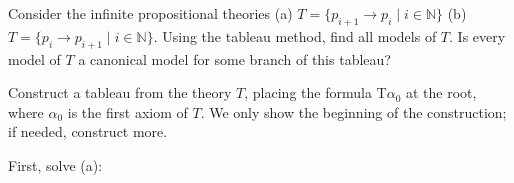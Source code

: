 \begin{problem}

    Consider the infinite propositional theories (a) $T=\{p_{i+1} \to p_i\mid i\in \mathbb{N}\}$ (b) $T=\{p_i \to p_{i+1}\mid i\in \mathbb{N}\}$. Using the tableau method, find all models of $T$. Is every model of $T$ a canonical model for some branch of this tableau? %

    \begin{solution}

        Construct a tableau from the theory $T$, placing the formula $\mathrm{T}\alpha_0$ at the root, where $\alpha_0$ is the first axiom of $T$. We only show the beginning of the construction; if needed, construct more.

        First, solve (a):
        

\end{solution}
\end{problem}
